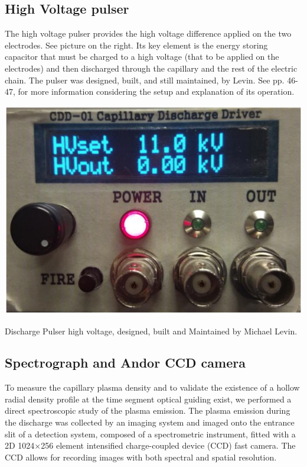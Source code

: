\documentclass[../main.tex]{subfiles}
\begin{document}
\subsection{High Voltage pulser}
The high voltage pulser provides the high voltage difference applied on the two electrodes. See picture on the right. Its key element is the energy storing capacitor that must be charged to a high voltage (that to be applied on the electrodes) and then discharged through the capillary and the rest of the electric chain. The pulser was designed, built, and still maintained, by Levin. See  \cite{Levin2009ExcitationAcceleration} pp. 46-47, for more information considering the setup and explanation of its operation.
\begin{marginfigure}
\includegraphics[width=\marginparwidth]{figures/hvpulser.PNG}
\caption{Discharge Pulser high voltage, designed, built and Maintained by Michael Levin.}
\end{marginfigure}
	
\subsection{Spectrograph and Andor CCD camera}\label{ssec:spectro}
To measure the capillary plasma density and to validate the existence of a hollow radial density profile at the time segment optical guiding exist, we performed a direct spectroscopic study of the plasma emission. The plasma emission during the discharge was collected by an imaging system and imaged onto the entrance slit of a detection system, composed of a spectrometric instrument, fitted with a 2D 1024$\times$256 element intensified charge-coupled device (CCD) fast camera. The CCD allows for recording images with both spectral and spatial resolution.
\end{document}
